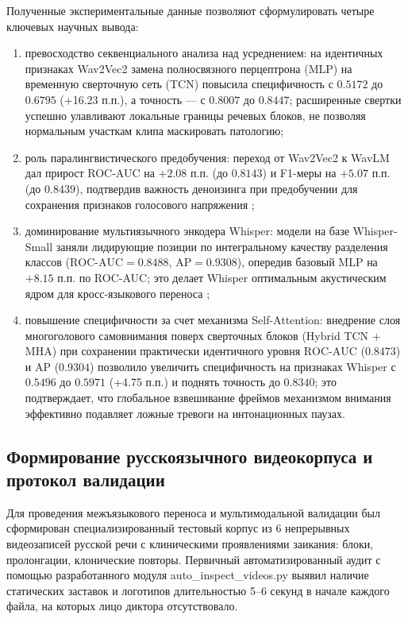 \documentclass[a4paper,14pt]{extarticle}
\begin{document}
	Полученные экспериментальные данные позволяют сформулировать четыре ключевых научных вывода:
	\begin{enumerate}
		\item превосходство секвенциального анализа над усреднением: на идентичных признаках Wav2Vec2 \cite{wav2vec} замена полносвязного перцептрона (MLP) на временную сверточную сеть (TCN) \cite{tcn} повысила специфичность с $0.5172$ до $0.6795$ (+16.23 п.п.), а точность — с $0.8007$ до $0.8447$; расширенные свертки успешно улавливают локальные границы речевых блоков, не позволяя нормальным участкам клипа маскировать патологию;
		\item роль паралингвистического предобучения: переход от Wav2Vec2 \cite{wav2vec} к WavLM \cite{wavlm} дал прирост ROC-AUC на $+2.08$ п.п. (до $0.8143$) и F1-меры на $+5.07$ п.п. (до $0.8439$), подтвердив важность деноизинга при предобучении для сохранения признаков голосового напряжения \cite{wavlm};
		\item доминирование мультиязычного энкодера Whisper: модели на базе Whisper-Small \cite{whisper} заняли лидирующие позиции по интегральному качеству разделения классов ($\text{ROC-AUC} = 0.8488$, $\text{AP} = 0.9308$), опередив базовый MLP на $+8.15$ п.п. по ROC-AUC; это делает Whisper оптимальным акустическим ядром для кросс-языкового переноса \cite{ivankin, whisper};
		\item повышение специфичности за счет механизма Self-Attention: внедрение слоя многоголового самовнимания поверх сверточных блоков (Hybrid TCN + MHA) при сохранении практически идентичного уровня $\text{ROC-AUC}$ ($0.8473$) и $\text{AP}$ ($0.9304$) позволило увеличить специфичность на признаках Whisper с $0.5496$ до $0.5971$ (+4.75 п.п.) и поднять точность до $0.8340$; это подтверждает, что глобальное взвешивание фреймов механизмом внимания эффективно подавляет ложные тревоги на интонационных паузах.
	\end{enumerate}
	
	\subsection{Формирование русскоязычного видеокорпуса и протокол валидации}
	Для проведения межъязыкового переноса и мультимодальной валидации был сформирован специализированный тестовый корпус из 6 непрерывных видеозаписей русской речи с клиническими проявлениями заикания: блоки, пролонгации, клонические повторы. Первичный автоматизированный аудит с помощью разработанного модуля auto\_inspect\_videos.py выявил наличие статических заставок и логотипов длительностью 5--6 секунд в начале каждого файла, на которых лицо диктора отсутствовало. 
	
\end{document}
